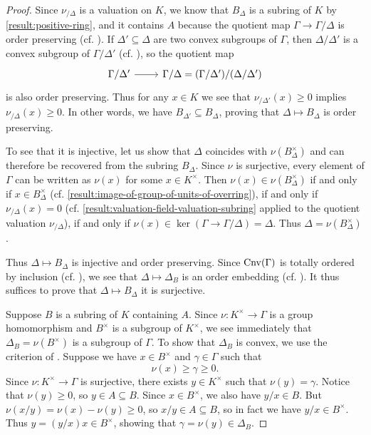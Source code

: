 \begin{proof}
Since $\nu_{/\Delta}$ is a valuation on $K$, we know that $B_\Delta$ is a subring of $K$ by \cref{result:positive-ring}, and it contains $A$ because the quotient map $\Gamma \to \Gamma/\Delta$ is order preserving (cf. ). If $\Delta' \subseteq \Delta$ are two convex subgroups of $\Gamma$, then $\Delta/\Delta'$ is a convex subgroup of $\Gamma/\Delta'$ (cf. ), so the quotient map 
\[ \begin{tikzcd} \Gamma/\Delta' \ar{r} & \Gamma/\Delta = (\Gamma/\Delta')/(\Delta/\Delta') \end{tikzcd} \] is also order preserving. Thus for any $x \in K$ we see that $\nu_{/\Delta'}(x) \geq  0$ implies $\nu_{/\Delta}(x) \geq 0$. In other words, we have $B_{\Delta'} \subseteq B_\Delta$, proving that $\Delta \mapsto B_\Delta$ is order preserving. 

To see that it is injective, let us show that $\Delta$ coincides with $\nu(B_\Delta^\times)$ and can therefore be recovered from the subring $B_\Delta$. Since $\nu$ is surjective, every element of $\Gamma$ can be written as $\nu(x)$ for some $x \in K^\times$. Then $\nu(x) \in \nu(B_\Delta^\times)$ if and only if $x \in B_\Delta^\times$ (cf.  \cref{result:image-of-group-of-units-of-overring}), if and only if $\nu_{/\Delta}(x) = 0$ (cf. \cref{result:valuation-field-valuation-subring} applied to the quotient valuation $\nu_{/\Delta}$), if and only if $\nu(x) \in \ker(\Gamma \to \Gamma/\Delta) = \Delta$. Thus $\Delta = \nu(B_\Delta^\times)$. 

Thus $\Delta \mapsto B_\Delta$ is injective and order preserving. Since $\operatorname{Cnv}(\Gamma)$ is totally ordered by inclusion (cf. ), we see that $\Delta \mapsto \Delta_B$ is an order embedding (cf. ). It thus suffices to prove that $\Delta \mapsto B_\Delta$ it is surjective.

Suppose $B$ is a subring of $K$ containing $A$. Since $\nu : K^\times \to \Gamma$ is a group homomorphism and $B^\times$ is a subgroup of $K^\times$, we see immediately that $\Delta_B = \nu(B^\times)$ is a subgroup of $\Gamma$. To show that $\Delta_B$ is convex, we use the criterion of . Suppose we have $x \in B^\times$ and $\gamma \in \Gamma$ such that 
\[ \nu(x) \geq \gamma \geq 0. \]
Since $\nu : K^\times \to \Gamma$ is surjective, there exists $y \in K^\times$ such that $\nu(y) = \gamma$. Notice that $\nu(y) \geq 0$, so $y \in A \subseteq B$. Since $x \in B^\times$, we also have $y/x \in B$. But $\nu(x/y) = \nu(x) - \nu(y) \geq 0$, so $x/y \in A \subseteq B$, so in fact we have $y/x \in B^\times$. Thus $y = (y/x)x \in B^\times$, showing that $\gamma = \nu(y) \in \Delta_B$. 


\end{proof}
